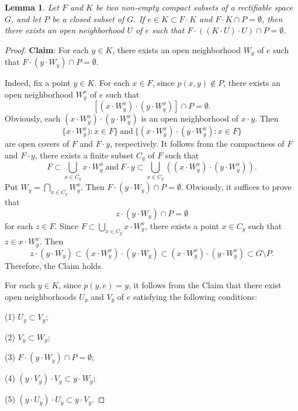 \documentclass[psamsfonts,fceqn,leqno]{amsart}
\newtheorem{lemma}[theorem]{Lemma}
\theoremstyle{definition}
\begin{document}
\begin{lemma}\label{compact-separated}
Let $F$ and $K$ be two non-empty compact subsets of a rectifiable space $G$, and let $P$ be a closed subset of $G$. If $e\in K\subset F\cdot K$ and $F\cdot K\cap P=\emptyset$, then there exists an open neighborhood $U$ of $e$ such that $F\cdot ((K\cdot U)\cdot U)\cap P=\emptyset$.
\end{lemma}

\begin{proof}
{\bf Claim}: For each $y\in K$, there exists an open neighborhood $W_{y}$ of $e$ such that $F\cdot (y\cdot W_{y})\cap P=\emptyset$.
\smallskip

Indeed, fix a point $y\in K$. For each $x\in F$, since $p(x, y)\not\in P$, there exists an open neighborhood $W_{y}^{x}$ of $e$ such that $$[(x\cdot W_{y}^{x})\cdot (y\cdot W_{y}^{x})]\cap P=\emptyset.$$ Obviously, each $(x\cdot W_{y}^{x})\cdot (y\cdot W_{y}^{x})$ is an open neighborhood of $x\cdot y$. Then $$\{x\cdot W_{y}^{x}): x\in F\}\ \mbox{and}\ \{(x\cdot W_{y}^{x})\cdot (y\cdot W_{y}^{x}): x\in F\}$$ are open covers of $F$ and $F\cdot y$, respectively. It follows from the compactness of $F$ and $F\cdot y$, there exists a finite subset $C_{y}$ of $F$ such that $$F\subset \bigcup_{x\in C_{y}}x\cdot W_{y}^{x}\  \mbox{and}\ F\cdot y\subset \bigcup_{x\in C_{y}}((x\cdot W_{y}^{x})\cdot (y\cdot W_{y}^{x})).$$ Put $W_{y}=\bigcap_{x\in C_{y}} W_{y}^{x}$. Then $F\cdot (y\cdot W_{y})\cap P=\emptyset.$
Obviously, it suffices to prove that $$z\cdot (y\cdot W_{y})\cap P=\emptyset$$ for each $z\in F$. Since $F\subset \bigcup_{x\in C_{y}}x\cdot W_{y}^{x}$, there exists a point $x\in C_{y}$ such that $z\in x\cdot W_{y}^{x}$. Then
$$z\cdot (y\cdot W_{y})\subset (x\cdot W_{y}^{x})\cdot (y\cdot W_{y})\subset (x\cdot W_{y}^{x})\cdot (y\cdot W_{y}^{x})\subset G\setminus P. $$ Therefore, the Claim holds.

For each $y\in K$, since $p(y, e)=y$, it follows from the Claim that there exist open neighborhoods $U_{y}$ and $V_{y}$ of $e$ satisfying the following conditions:
\smallskip

(1) $U_{y}\subset V_{y}$;
\smallskip

(2) $V_{y}\subset W_{y}$;
\smallskip

(3) $F\cdot (y\cdot W_{y})\cap P=\emptyset$;
\smallskip

(4) $(y\cdot V_{y})\cdot V_{y}\subset y\cdot W_{y}$;
\smallskip

(5) $(y\cdot U_{y})\cdot U_{y}\subset y\cdot V_{y}$.
\smallskip


\end{proof}
\end{document}
